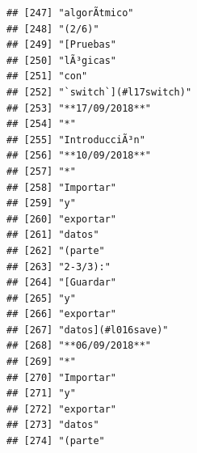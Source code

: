 \documentclass[
]{book}
\begin{document}
\begin{verbatim}
## [247] "algorÃ­tmico"                                                                     
## [248] "(2/6)"                                                                            
## [249] "[Pruebas"                                                                         
## [250] "lÃ³gicas"                                                                         
## [251] "con"                                                                              
## [252] "`switch`](#l17switch)"                                                            
## [253] "**17/09/2018**"                                                                   
## [254] "*"                                                                                
## [255] "IntroducciÃ³n"                                                                    
## [256] "**10/09/2018**"                                                                   
## [257] "*"                                                                                
## [258] "Importar"                                                                         
## [259] "y"                                                                                
## [260] "exportar"                                                                         
## [261] "datos"                                                                            
## [262] "(parte"                                                                           
## [263] "2-3/3):"                                                                          
## [264] "[Guardar"                                                                         
## [265] "y"                                                                                
## [266] "exportar"                                                                         
## [267] "datos](#l016save)"                                                                
## [268] "**06/09/2018**"                                                                   
## [269] "*"                                                                                
## [270] "Importar"                                                                         
## [271] "y"                                                                                
## [272] "exportar"                                                                         
## [273] "datos"                                                                            
## [274] "(parte"                                                                           

\end{verbatim}
\end{document}
